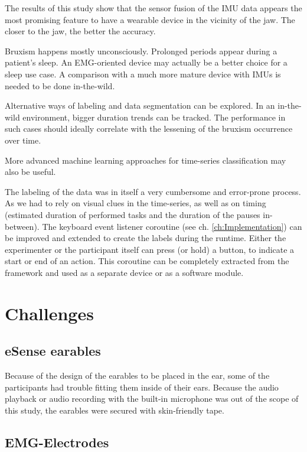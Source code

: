 The results of this study show that the sensor fusion of the IMU data appears the most promising feature to have a wearable device in the vicinity of the jaw. The closer to the jaw, the better the accuracy.

Bruxism happens mostly unconsciously. Prolonged periods appear during a patient's sleep. An EMG-oriented device may actually be a better choice for a sleep use case. A comparison with a much more mature device with IMUs is needed to be done in-the-wild.

Alternative ways of labeling and data segmentation can be explored. In an in-the-wild environment, bigger duration trends can be tracked. The performance in such cases should ideally correlate with the lessening of the bruxism occurrence over time.

More advanced machine learning approaches for time-series classification may also be useful.

The labeling of the data was in itself a very cumbersome and error-prone process. As we had to rely on visual clues in the time-series, as well as on timing (estimated duration of performed tasks and the duration of the pauses in-between). The keyboard event listener coroutine (see ch. \ref{ch:Implementation}) can be improved and extended to create the labels during the runtime. Either the experimenter or the participant itself can press (or hold) a button, to indicate a start or end of an action. This coroutine can be completely extracted from the framework and used as a separate device or as a software module.

\section{Challenges}
\label{sub:attachment_problems}

\subsection{eSense earables}
\label{par:esense_attachment}

Because of the design of the earables to be placed in the ear, some of the participants had trouble fitting them inside of their ears. Because the audio playback or audio recording with the built-in microphone was out of the scope of this study, the earables were secured with skin-friendly tape.

\subsection{EMG-Electrodes}
\label{par:emg_attachment}

